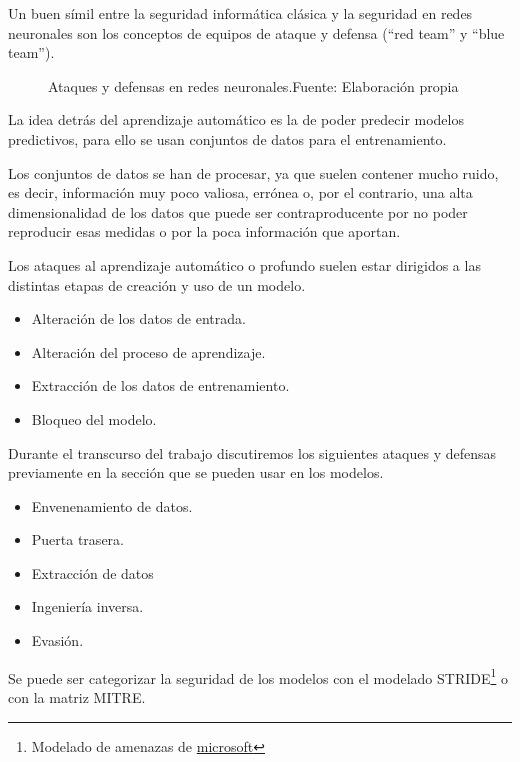 Un buen símil entre la seguridad informática clásica y la seguridad en redes neuronales son los conceptos de equipos de ataque y defensa (``red team'' y ``blue team'').

\begin{figure}[H]
    \centering
    \centerline{}
    \caption{Ataques y defensas en redes neuronales.\newline{}Fuente: Elaboración propia}
    \label{fig:art-for-red-and-blue-teams}
\end{figure}

La idea detrás del aprendizaje automático es la de poder predecir modelos predictivos, para ello se usan conjuntos de datos para el entrenamiento.

Los conjuntos de datos se han de procesar, ya que suelen contener mucho ruido, es decir, información muy poco valiosa, errónea o, por el contrario, una alta dimensionalidad de los datos que puede ser contraproducente por no poder reproducir esas medidas o por la poca información que aportan.

Los ataques al aprendizaje automático o profundo suelen estar dirigidos a las distintas etapas de creación y uso de un modelo.

\begin{itemize}
    \item Alteración de los datos de entrada.
    \item Alteración del proceso de aprendizaje.
    \item Extracción de los datos de entrenamiento.
    \item Bloqueo del modelo.
\end{itemize}

Durante el transcurso del trabajo discutiremos los siguientes ataques y defensas previamente en la sección  que se pueden usar en los modelos.

\begin{itemize}
    \item Envenenamiento de datos.
    \item Puerta trasera.
    \item Extracción de datos
    \item Ingeniería inversa.
    \item Evasión.
\end{itemize}

Se puede ser categorizar la seguridad de los modelos con el modelado \gls{STRIDE}\footnote{Modelado de amenazas de \href{https://learn.microsoft.com/es-es/azure/security/develop/threat-modeling-tool-threats}{microsoft}} o con la matriz \gls{MITRE}.

